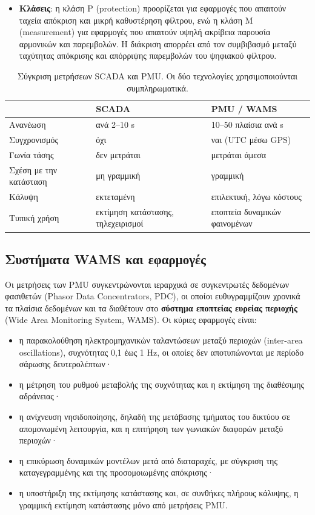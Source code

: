 \begin{itemize}
\item \textbf{Κλάσεις}: η κλάση P (protection) προορίζεται για εφαρμογές που απαιτούν ταχεία
      απόκριση και μικρή καθυστέρηση φίλτρου, ενώ η κλάση M (measurement) για εφαρμογές
      που απαιτούν υψηλή ακρίβεια παρουσία αρμονικών και παρεμβολών. Η διάκριση απορρέει
      από τον συμβιβασμό μεταξύ ταχύτητας απόκρισης και απόρριψης παρεμβολών του
      ψηφιακού φίλτρου.
\end{itemize}

\begin{table}[!htbp]
\centering
\begin{tabular}{lll}
\hline
 & SCADA & PMU / WAMS \\
\hline
Ανανέωση         & ανά 2--10 s        & 10--50 πλαίσια ανά s \\
Συγχρονισμός     & όχι                & ναι (UTC μέσω GPS) \\
Γωνία τάσης      & δεν μετράται       & μετράται άμεσα \\
Σχέση με την κατάσταση & μη γραμμική & γραμμική \\
Κάλυψη           & εκτεταμένη         & επιλεκτική, λόγω κόστους \\
Τυπική χρήση     & εκτίμηση κατάστασης, τηλεχειρισμοί & εποπτεία δυναμικών φαινομένων \\
\hline
\end{tabular}
\caption{Σύγκριση μετρήσεων SCADA και PMU. Οι δύο τεχνολογίες χρησιμοποιούνται
συμπληρωματικά.}
\label{tab:scada-pmu}
\end{table}

\subsection{Συστήματα WAMS και εφαρμογές}

Οι μετρήσεις των PMU συγκεντρώνονται ιεραρχικά σε συγκεντρωτές δεδομένων φασιθετών (Phasor
Data Concentrators, PDC), οι οποίοι ευθυγραμμίζουν χρονικά τα πλαίσια δεδομένων και τα
διαθέτουν στο \textbf{σύστημα εποπτείας ευρείας περιοχής} (Wide Area Monitoring System,
WAMS). Οι κύριες εφαρμογές είναι:

\begin{itemize}
\item η παρακολούθηση ηλεκτρομηχανικών ταλαντώσεων μεταξύ περιοχών (inter-area
      oscillations), συχνότητας 0,1 έως 1 Hz, οι οποίες δεν αποτυπώνονται με περίοδο
      σάρωσης δευτερολέπτων·
\item η μέτρηση του ρυθμού μεταβολής της συχνότητας και η εκτίμηση της διαθέσιμης
      αδράνειας·
\item η ανίχνευση νησιδοποίησης, δηλαδή της μετάβασης τμήματος του δικτύου σε απομονωμένη
      λειτουργία, και η επιτήρηση των γωνιακών διαφορών μεταξύ περιοχών·
\item η επικύρωση δυναμικών μοντέλων μετά από διαταραχές, με σύγκριση της καταγεγραμμένης
      και της προσομοιωμένης απόκρισης·
\item η υποστήριξη της εκτίμησης κατάστασης και, σε συνθήκες πλήρους κάλυψης, η
      γραμμική εκτίμηση κατάστασης μόνο από μετρήσεις PMU.
\end{itemize}

